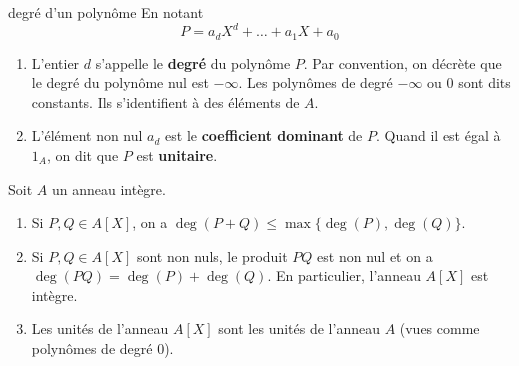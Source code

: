 \documentclass[]{report}
\begin{document}
\begin{df}{degré d'un polynôme}{}
    En notant
    \[P = a_d X^d + \dots + a_1 X + a_0\]
    \begin{enumerate}
        \item L'entier $d$ s'appelle le \textbf{degré} du polynôme $P$. Par convention, on décrète que le degré du polynôme nul est $-\infty$. Les polynômes de degré $-\infty$ ou $0$ sont dits constants. Ils s'identifient à des éléments de $A$.
        \item L'élément non nul $a_d$ est le \textbf{coefficient dominant} de $P$. Quand il est égal à $1_A$, on dit que $P$ est \textbf{unitaire}.
    \end{enumerate}
\end{df}

\begin{prop}{}{}
    Soit $A$ un anneau intègre.
    \begin{enumerate}
        \item Si $P, Q \in A[X]$, on a $\deg(P + Q) \le \max\{\deg(P), \deg(Q)\}$.
        \item Si $P, Q \in A[X]$ sont non nuls, le produit $PQ$ est non nul et on a $\deg(PQ) = \deg(P) + \deg(Q)$. En particulier, l'anneau $A[X]$ est intègre.
        \item Les unités de l'anneau $A[X]$ sont les unités de l'anneau $A$ (vues comme polynômes de degré $0$).
    \end{enumerate}
\end{prop}
\end{document}
